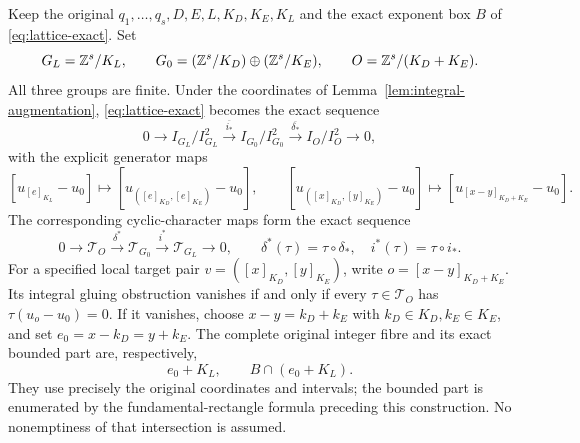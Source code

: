 \begin{theorem}
\label{thm:cyclic-lattice-gluing}
Keep the original \(q_1,\ldots,q_s,D,E,L,K_D,K_E,K_L\) and
the exact exponent box \(B\) of \eqref{eq:lattice-exact}. Set
\[
 G_L=\mathbb Z^s/K_L,\qquad
 G_0=(\mathbb Z^s/K_D)\oplus(\mathbb Z^s/K_E),\qquad
 O=\mathbb Z^s/(K_D+K_E).
\]
All three groups are finite. Under the coordinates of
Lemma~\ref{lem:integral-augmentation}, \eqref{eq:lattice-exact}
becomes the exact sequence
\[
 0\longrightarrow I_{G_L}/I_{G_L}^2
 \xrightarrow{\overline{i_*}} I_{G_0}/I_{G_0}^2
 \xrightarrow{\overline{\delta_*}} I_O/I_O^2
 \longrightarrow0,
\]
with the explicit generator maps
\[
 [u_{[e]_{K_L}}-u_0]\longmapsto
 [u_{([e]_{K_D},[e]_{K_E})}-u_0],\qquad
 [u_{([x]_{K_D},[y]_{K_E})}-u_0]\longmapsto
 [u_{[x-y]_{K_D+K_E}}-u_0].
\]
The corresponding cyclic-character maps form the exact sequence
\[
 0\longrightarrow\mathcal T_O
 \xrightarrow{\delta^*}\mathcal T_{G_0}
 \xrightarrow{i^*}\mathcal T_{G_L}\longrightarrow0,
 \qquad \delta^*(\tau)=\tau\circ\delta_*,\quad
 i^*(\tau)=\tau\circ i_*.
\]
For a specified local target pair
\(v=([x]_{K_D},[y]_{K_E})\), write
\(o=[x-y]_{K_D+K_E}\). Its integral gluing obstruction vanishes
if and only if every \(\tau\in\mathcal T_O\) has
\(\tau(u_o-u_0)=0\). If it vanishes, choose
\(x-y=k_D+k_E\) with \(k_D\in K_D,k_E\in K_E\), and set
\(e_0=x-k_D=y+k_E\). The complete original integer fibre and
its exact bounded part are, respectively,
\[
 e_0+K_L,\qquad B\cap(e_0+K_L).
\]
They use precisely the original coordinates and intervals; the bounded
part is enumerated by the fundamental-rectangle formula preceding
this construction. No nonemptiness of that intersection is assumed.
\end{theorem}

